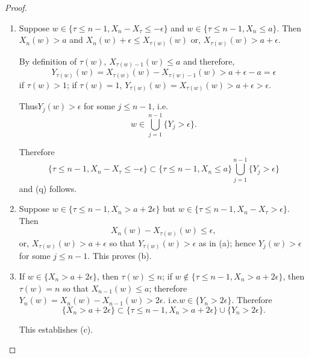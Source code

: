\begin{proof}
\begin{enumerate}
\renewcommand{\theenumi}{\alph{enumi}}
\renewcommand{\labelenumi}{(\theenumi)}
\item Suppose $w\in \{\tau\leq n-1,X_{n}-X_{\tau}\leq -\epsilon\}$ and
  $w\in \{\tau\leq n-1,X_{n}\leq a\}$. Then $X_{n}(w)>a$ and
  $X_{n}(w)+\epsilon\leq X_{\tau(w)}(w)$ or,
  $X_{\tau(w)}(w)>a+\epsilon$.

By definition of $\tau(w)$, $X_{\tau(w)-1}(w)\leq a$ and therefore,
$$
Y_{\tau(w)}(w)=X_{\tau(w)}(w)-X_{\tau(w)-1}(w)>a+\epsilon-a=\epsilon
$$
if $\tau(w)>1$; if $\tau(w)=1$,
$Y_{\tau(w)}(w)=X_{\tau(w)}(w)>a+\epsilon>\epsilon$. 

Thus\pageoriginale $Y_{j}(w)>\epsilon$ for some $j\leq n-1$, i.e.
$$
w\in \bigcup\limits^{n-1}_{j=1}\{Y_{j}>\epsilon\}.
$$

Therefore
$$
\{\tau\leq n-1,X_{n}-X_{\tau}\leq -\epsilon\}\subset \{\tau\leq
n-1,X_{n}\leq a\}\bigcup\limits^{n-1}_{j=1}\{Y_{j}>\epsilon\}
$$
and (q) follows.

\item Suppose $w\in \{\tau\leq n-1,X_{n}>a+2\epsilon\}$ but $w\in
  \{\tau\leq n-1,X_{n}-X_{\tau}>\epsilon\}$. Then 
$$
X_{n}(w)-X_{\tau(w)}(w)\leq \epsilon,
$$
or, $X_{\tau(w)}(w)>a+\epsilon$ so that $Y_{\tau(w)}(w)>\epsilon$ as
in (a); hence $Y_{j}(w)>\epsilon$ for some $j\leq n-1$. This proves
(b).

\item If $w\in \{X_{n}>a+2\epsilon\}$, then $\tau(w)\leq n$; if
  $w\not\in \{\tau\leq n-1,X_{n}>a+2\epsilon\}$, then $\tau(w)=n$ so
  that $X_{n-1}(w)\leq a$; therefore
  $Y_{n}(w)=X_{n}(w)-X_{n-1}(w)>2\epsilon$. i.e.\@ $w\in
  \{Y_{n}>2\epsilon\}$. Therefore
$$
\{X_{n}>a+2\epsilon\}\subset \{\tau\leq n-1,X_{n}>a+2\epsilon\}\cup\{Y_{n}>2\epsilon\}.
$$

This establishes (c).


\end{enumerate}
\end{proof}

